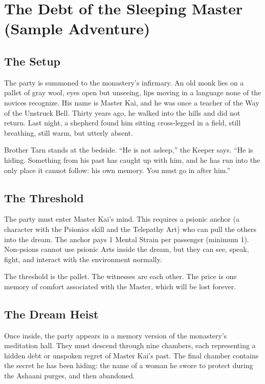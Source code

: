 \documentclass[11pt]{book}
\begin{document}
\chapter{The Debt of the Sleeping Master (Sample Adventure)}

\section{The Setup}

The party is summoned to the monastery's infirmary. An old monk lies on a pallet of gray wool, eyes open but unseeing, lips moving in a language none of the novices recognize. His name is Master Kai, and he was once a teacher of the Way of the Unstruck Bell. Thirty years ago, he walked into the hills and did not return. Last night, a shepherd found him sitting cross-legged in a field, still breathing, still warm, but utterly absent.

Brother Tarn stands at the bedside. ``He is not asleep,'' the Keeper says. ``He is hiding. Something from his past has caught up with him, and he has run into the only place it cannot follow: his own memory. You must go in after him.''

\section{The Threshold}

The party must enter Master Kai's mind. This requires a psionic anchor (a character with the Psionics skill and the Telepathy Art) who can pull the others into the dream. The anchor pays 1 Mental Strain per passenger (minimum 1). Non-psions cannot use psionic Arts inside the dream, but they can see, speak, fight, and interact with the environment normally.

The threshold is the pallet. The witnesses are each other. The price is one memory of comfort associated with the Master, which will be lost forever.

\section{The Dream Heist}

Once inside, the party appears in a memory version of the monastery's meditation hall. They must descend through nine chambers, each representing a hidden debt or unspoken regret of Master Kai's past. The final chamber contains the secret he has been hiding: the name of a woman he swore to protect during the Ashaani purges, and then abandoned.
\end{document}
